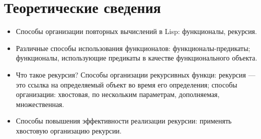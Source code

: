 \chapter{Теоретические сведения}

\begin{itemize}
    \item Способы организации повторных вычислений в Lisp: функционалы, рекурсия.
    \item Различные способы использования функционалов: функционалы-предикаты; функционалы, использующие предикаты в качестве функционального объекта.
    \item Что такое рекурсия? Способы организации рекурсивных функци: рекурсия — это ссылка на определяемый объект во время его определения; способы организации: хвостовая, по нескольким параметрам, дополняемая, множественная.
    \item Способы повышения эффективности реализации рекурсии: применять хвостовую организацию рекурсии.
\end{itemize}

